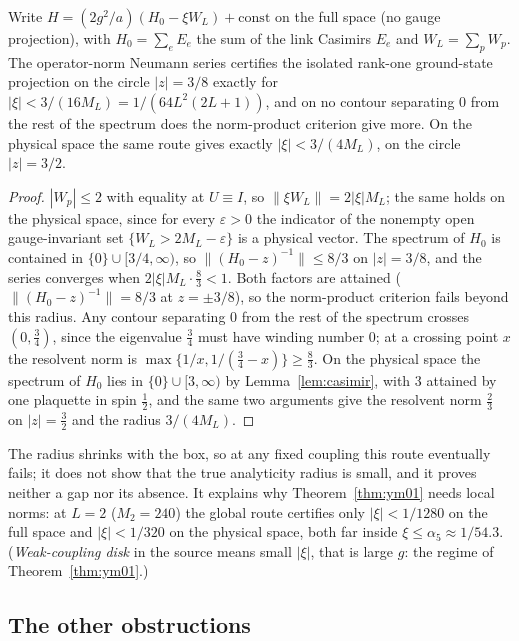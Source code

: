 \begin{proposition}\label{prop:neumann}
Write $H=(2g^2/a)(H_0-\xi W_L)+\mathrm{const}$ on the full space (no gauge projection), with $H_0=\sum_eE_e$ the sum of the link Casimirs $E_e$ and $W_L=\sum_pW_p$. The operator-norm Neumann series certifies the isolated rank-one ground-state projection on the circle $|z|=3/8$ exactly for $|\xi|<3/(16M_L)=1/(64L^2(2L+1))$, and on no contour separating $0$ from the rest of the spectrum does the norm-product criterion give more. On the physical space the same route gives exactly $|\xi|<3/(4M_L)$, on the circle $|z|=3/2$.
\end{proposition}
\begin{proof}
$|W_p|\le2$ with equality at $U\equiv I$, so $\|\xi W_L\|=2|\xi|M_L$; the same holds on the physical space, since for every $\varepsilon>0$ the indicator of the nonempty open gauge-invariant set $\{W_L>2M_L-\varepsilon\}$ is a physical vector. The spectrum of $H_0$ is contained in $\{0\}\cup[3/4,\infty)$, so $\|(H_0-z)^{-1}\|\le8/3$ on $|z|=3/8$, and the series converges when $2|\xi|M_L\cdot\frac83<1$. Both factors are attained ($\|(H_0-z)^{-1}\|=8/3$ at $z=\pm3/8$), so the norm-product criterion fails beyond this radius. Any contour separating $0$ from the rest of the spectrum crosses $(0,\frac34)$, since the eigenvalue $\frac34$ must have winding number $0$; at a crossing point $x$ the resolvent norm is $\max\{1/x,1/(\frac34-x)\}\ge\frac83$. On the physical space the spectrum of $H_0$ lies in $\{0\}\cup[3,\infty)$ by Lemma~\ref{lem:casimir}, with $3$ attained by one plaquette in spin $\frac12$, and the same two arguments give the resolvent norm $\frac23$ on $|z|=\frac32$ and the radius $3/(4M_L)$.
\end{proof}
The radius shrinks with the box, so at any fixed coupling this route eventually fails; it does not show that the true analyticity radius is small, and it proves neither a gap nor its absence. It explains why Theorem~\ref{thm:ym01} needs local norms: at $L=2$ ($M_2=240$) the global route certifies only $|\xi|<1/1280$ on the full space and $|\xi|<1/320$ on the physical space, both far inside $\xi\le\alpha_5\approx1/54.3$. (\emph{Weak-coupling disk} in the source means small $|\xi|$, that is large $g$: the regime of Theorem~\ref{thm:ym01}.)


\subsection{The other obstructions}

